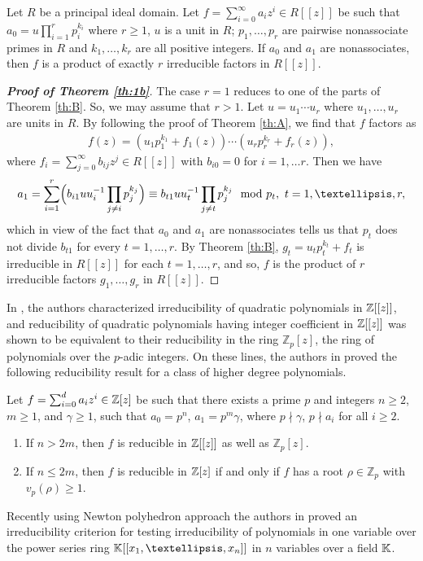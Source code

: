 \documentclass[12pt,reqno]{amsart}%
\begin{document}
\begin{thmx}\label{th:1b}
Let $R$ be a principal ideal domain. Let $f = \sum_{i=0}^\infty a_i z^i\in R[[z]]$ be such that $a_0=u\prod_{i=1}^r p_i^{k_i}$ where $r\geq 1$, $u$ is a unit in $R$; $p_1,\ldots,p_r$ are pairwise nonassociate primes in $R$ and $k_1,\ldots,k_r$ are all positive integers. If $a_0$ and $a_1$ are nonassociates, then $f$ is a product of exactly $r$ irreducible factors in $R[[z]]$.
\end{thmx}
\begin{proof}[\bf Proof of Theorem \ref{th:1b}] The case $r=1$ reduces to one of the parts of Theorem \ref{th:B}. So, we may assume that $r>1$. Let $u=u_1\cdots u_r$ where $u_1,\ldots,u_r$ are units in $R$. By following the proof of Theorem \ref{th:A}, we find that $f$ factors as
\begin{eqnarray*}
f(z)=(u_1p_1^{k_1}+f_1(z))\cdots (u_rp_r^{k_r}+f_r(z)),
\end{eqnarray*}
where  $f_i=\sum_{j=0}^\infty b_{ij}z^j\in R[[z]]$ with $b_{i0}=0$  for $i=1,\ldots r$. Then we have
\begin{eqnarray*}
a_1=\sum_{i=1}^r\Bigl(b_{i1}uu_i^{-1}\prod_{j\neq i}{p_j^{k_j}}\Bigr)\equiv b_{t1}uu_t^{-1}\prod_{j\neq t}{p_j^{k_j}}\mod p_t,~t=1,\ldots, r,
\end{eqnarray*}
which in view of the fact that $a_0$ and $a_1$ are nonassociates tells us that $p_t$ does not divide $b_{t1}$ for every $t=1,\ldots, r$. By Theorem \ref{th:B}, $g_t=u_tp_t^{k_t}+f_t$ is irreducible in  $R[[z]]$ for each $t=1,\ldots, r$, and so, $f$ is the product of $r$ irreducible factors $g_1,\ldots,g_r$ in $R[[z]]$.
\end{proof}
In \cite{Daniel2007}, the authors characterized irreducibility of quadratic polynomials in $\Bbb{Z}[[z]]$, and reducibility of quadratic polynomials having integer coefficient in $\Bbb{Z}[[z]]$ was shown to be equivalent to their reducibility in the ring $\mathbb{Z}_p[z]$, the ring of polynomials over the $p$-adic integers. On these lines, the authors in \cite{Daniel2007} proved the following reducibility result for a class of higher degree polynomials.
\begin{thmx}\label{th:A2}
Let $f=\sum_{i=0}^d a_iz^i\in \Bbb{Z}[z]$ be such that there exists a prime $p$ and integers $n\geq 2$, $m\geq 1$, and $\gamma\geq 1$,  such that  $a_0=p^n$,  $a_1=p^m \gamma$, where $p\nmid \gamma$, $p\nmid a_i$ for all $i\geq 2$.
\begin{enumerate}
    \item[(i)] If $n>2m$, then $f$ is reducible in  $\Bbb{Z}[[z]]$ as well as $\mathbb{Z}_p[z]$.
    \item[(ii)] If $n\leq 2m$, then $f$ is reducible in $\Bbb{Z}[z]$ if and only if $f$ has a root  $\rho\in\mathbb{Z}_p$ with $v_p(\rho)\geq 1$.
\end{enumerate}
\end{thmx}
Recently using Newton polyhedron approach the authors in \cite{Rond} proved an irreducibility criterion for testing irreducibility of polynomials in one variable over the power series ring $\K[[x_1,\ldots,x_n]]$ in $n$ variables over a field $\mathbb{K}$.
\end{document}
